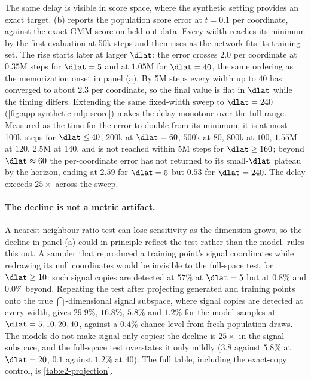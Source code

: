 The same delay is visible in score space, where the synthetic setting provides an exact target. (b) reports the population score error at $t=0.1$ per coordinate, against the exact GMM score on held-out data. Every width reaches its minimum by the first evaluation at 50k steps and then rises as the network fits its training set. The rise starts later at larger $\dlat$: the error crosses $2.0$ per coordinate at $0.35$M steps for $\dlat=5$ and at $1.05$M for $\dlat=40$, the same ordering as the memorization onset in panel (a). By 5M steps every width up to $40$ has converged to about $2.3$ per coordinate, so the final value is flat in $\dlat$ while the timing differs. Extending the same fixed-width sweep to $\dlat=240$ (\cref{fig:app-synthetic-mlp-score}) makes the delay monotone over the full range. Measured as the time for the error to double from its minimum, it is at most 100k steps for $\dlat\le40$, $200$k at $\dlat=60$, $500$k at $80$, $800$k at $100$, $1.55$M at $120$, $2.5$M at $140$, and is not reached within 5M steps for $\dlat\ge160$; beyond $\dlat\approx60$ the per-coordinate error has not returned to its small-$\dlat$ plateau by the horizon, ending at $2.59$ for $\dlat=5$ but $0.53$ for $\dlat=240$. The delay exceeds $25\times$ across the sweep.

\paragraph{The decline is not a metric artifact.}
A nearest-neighbour ratio test can lose sensitivity as the dimension grows, so the decline in panel (a) could in principle reflect the test rather than the model.  rules this out. A sampler that reproduced a training point's signal coordinates while redrawing its null coordinates would be invisible to the full-space test for $\dlat\ge10$: such signal copies are detected at $57\%$ at $\dlat=5$ but at $0.8\%$ and $0.0\%$ beyond. Repeating the test after projecting generated and training points onto the true $\dint$-dimensional signal subspace, where signal copies are detected at every width, gives $29.9\%$, $16.8\%$, $5.8\%$ and $1.2\%$ for the model samples at $\dlat=5,10,20,40$, against a $0.4\%$ chance level from fresh population draws. The models do not make signal-only copies: the decline is $25\times$ in the signal subspace, and the full-space test overstates it only mildly ($3.8$ against $5.8\%$ at $\dlat=20$, $0.1$ against $1.2\%$ at $40$). The full table, including the exact-copy control, is \cref{tab:e2-projection}.

